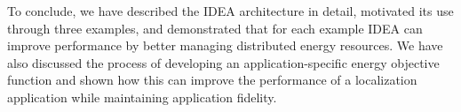 To conclude, we have described the IDEA architecture in detail, motivated its
use through three examples, and demonstrated that for each example IDEA can
improve performance by better managing distributed energy resources. We have
also discussed the process of developing an application-specific energy
objective function and shown how this can improve the performance of a
localization application while maintaining application fidelity.
\vfill\eject
